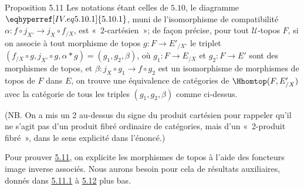 \documentclass[10pt]{../fichiers-configuration-latex/smfart}
\begin{document}
\begin{enonce*}{Proposition 5.11}
Les notations étant celles de $\hyperref[IV.subsec5.10]{5.10}$, le diagramme
$\eqhyperref[IV.eq5.10.1]{5.10.1}$, muni de l'isomorphisme de compatibilité
$\alpha:f\circ j_{X'}\rightarrow j_X\circ f_{/X}$, est « $2$-cartésien »; de façon précise, pour tout
$𝒰$-topos $F$, si on associe à tout morphisme de topos
$g:F\rightarrow E'_{/X'}$ le triplet $(f_{/X}\circ g, j_{X'}\circ g,
\alpha\ast g)=(g_1, g_2,\beta)$, où $g_1:F\rightarrow E_{/X}$ et
$g_2:F\rightarrow E'$ sont des morphismes de topos, et
$\beta:j_X\circ g_1\rightarrow f\circ g_2$ est un isomorphisme de
morphismes de topos de $F$ dans $E$, on trouve une équivalence de
catégories de $\Hhomtop(F,E'_{/X})$ avec la catégorie
 de
tous les triples $(g_1,g_2,\beta)$ comme ci-dessus.
\end{enonce*}

(NB. On a mis un 2 au-dessus du signe du produit cartésien pour
rappeler qu'il ne s'agit pas d'un produit fibré ordinaire de
catégories, mais d'un « 2-produit fibré », dans le sens
explicité dans l'énoncé.)

Pour prouver \hyperref[IV.prop5.11]{5.11}, on explicite les morphismes de topos
à l'aide des foncteurs image inverse associés. Nous aurons
besoin pour cela de résultats auxiliaires, donnés dans
\hyperref[IV.subsubsec5.11.1]{5.11.1} à \hyperref[IV.prop5.12]{5.12} plus bas.

\setcounter{subsection}{11} \setcounter{subsubsection}{0}
\end{document}
